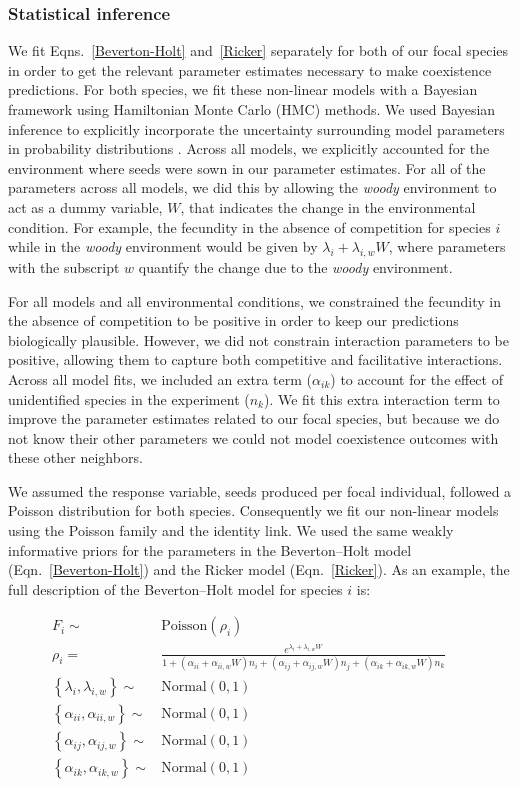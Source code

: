 \subsubsection*{Statistical inference}

We fit Eqns.~\ref{Beverton-Holt} and~\ref{Ricker} separately for both of our focal species in order to get the relevant parameter estimates necessary to make coexistence predictions. For both species, we fit these non-linear models with a Bayesian framework using Hamiltonian Monte Carlo (HMC) methods. We used Bayesian inference to explicitly incorporate the uncertainty surrounding model parameters in probability distributions \citep{mcelreath_statistical_2018}. Across all models, we explicitly accounted for the environment where seeds were sown in our parameter estimates. For all of the parameters across all models, we did this by allowing the \textit{woody} environment to act as a dummy variable, $W$, that indicates the change in the environmental condition. For example, the fecundity in the absence of competition for species $i$ while in the \textit{woody} environment would be given by $\lambda_{i} + \lambda_{i,w}W$, where parameters with the subscript $w$ quantify the change due to the \textit{woody} environment.


For all models and all environmental conditions, we constrained the fecundity in the absence of competition  to be positive in order to keep our predictions biologically plausible. However, we did not constrain interaction parameters to be positive, allowing them to capture both competitive and facilitative interactions. Across all model fits, we included an extra term ($\alpha_{ik}$) to account for the effect of unidentified species in the experiment ($n_{k}$). We fit this extra interaction term to improve the parameter estimates  related to our focal species, but because we do not know their other parameters we could not model coexistence outcomes with these other neighbors.

We assumed the response variable, seeds produced per focal individual, followed a Poisson distribution for both species. Consequently we fit our non-linear models using the Poisson family and the identity link. We used the same weakly informative priors for the parameters in the Beverton--Holt model (Eqn.~\ref{Beverton-Holt}) and the Ricker model (Eqn.~\ref{Ricker}). As an example, the full description of the Beverton--Holt model for species $i$ is:

\begin{align}
 F_{i} \sim& {\textrm{Poisson}}(\rho_{i}) && \\
\rho_{i} =& \frac{e^{\lambda_{i} + \lambda_{i,w}W}} {1 + (\alpha_{ii} + \alpha_{ii,w}W)n_{i} + (\alpha_{ij} + \alpha_{ij,w}W) n_{j} + (\alpha_{ik} + \alpha_{ik,w}W)n_{k}} &&   \\
{ \left \{ \lambda_{i}, \lambda_{i,w} \right \}} \sim& {\textrm{Normal}}(0,1) &&\\
 { \left \{ \alpha_{ii}, \alpha_{ii,w} \right \}} \sim& {\textrm{Normal}}(0,1) &&\\
 {\left \{ \alpha_{ij}, \alpha_{ij,w} \right \}} \sim& {\textrm{Normal}}(0,1) &&\\
 {\left \{ \alpha_{ik}, \alpha_{ik,w} \right \}} \sim& {\textrm{Normal}}(0,1) &&
\end{align}
